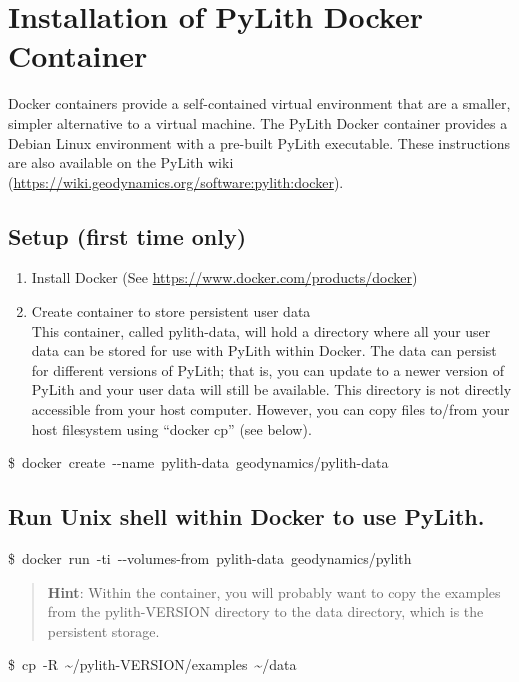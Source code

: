 \section{Installation of PyLith Docker Container}

Docker containers provide a self-contained virtual environment that
are a smaller, simpler alternative to a virtual machine. The PyLith
Docker container provides a Debian Linux environment with a pre-built
PyLith executable. These instructions are also available on the PyLith
wiki (\url{https://wiki.geodynamics.org/software:pylith:docker}).


\subsection{Setup (first time only)}
\begin{enumerate}
\item Install Docker (See \url{https://www.docker.com/products/docker})
\item Create container to store persistent user data\\
This container, called pylith-data, will hold a directory where all
your user data can be stored for use with PyLith within Docker. The
data can persist for different versions of PyLith; that is, you can
update to a newer version of PyLith and your user data will still
be available. This directory is not directly accessible from your
host computer. However, you can copy files to/from your host filesystem
using \textquotedblleft{}docker cp\textquotedblright{} (see below).\end{enumerate}
\begin{lyxcode}
\$~docker~create~-{}-name~pylith-data~geodynamics/pylith-data
\end{lyxcode}

\subsection{Run Unix shell within Docker to use PyLith.}
\begin{lyxcode}
\$~docker~run~-ti~-{}-volumes-from~pylith-data~geodynamics/pylith\end{lyxcode}
\begin{quote}
\textbf{Hint}: Within the container, you will probably want to copy
the examples from the pylith-VERSION directory to the data directory,
which is the persistent storage.\end{quote}
\begin{lyxcode}
\$~cp~-R~\textasciitilde{}/pylith-VERSION/examples~\textasciitilde{}/data
\end{lyxcode}


